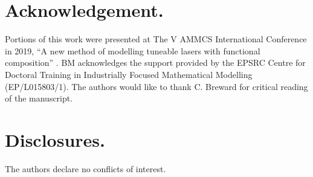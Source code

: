 \documentclass[9pt,twocolumn,twoside]{osajnl}
\begin{document}
\section*{Acknowledgement.}
Portions of this work were presented at The V AMMCS International Conference in 2019, ``A new method of modelling tuneable lasers with functional composition'' \cite{metherallammcs}. BM acknowledges the support provided by the EPSRC Centre for Doctoral Training in Industrially Focused Mathematical Modelling (EP/L015803/1). The authors would like to thank C. Breward for critical reading of the manuscript.

\section*{Disclosures.}
The authors declare no conflicts of interest.


\end{document}
